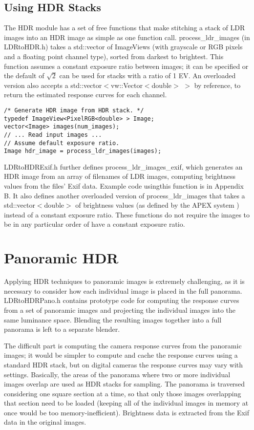 \subsection{Using HDR Stacks}
The HDR module has a set of free functions that make stitching a stack of LDR
images into an HDR image as simple as one function call. process\_ldr\_images (in 
LDRtoHDR.h) takes a std::vector of ImageViews (with grayscale or RGB pixels
and a floating point channel type), sorted from darkest to brightest. This
function assumes a constant exposure ratio between images; it can be specified
or the default of $\sqrt{2}$ can be used for stacks with a ratio of 1 EV. An
overloaded version also accepts a std::vector$<$vw::Vector$<$double$>$ $>$ by reference,
to return the estimated response curves for each channel.

\begin{verbatim}
/* Generate HDR image from HDR stack. */
typedef ImageView<PixelRGB<double> > Image;
vector<Image> images(num_images);
// ... Read input images ...
// Assume default exposure ratio.
Image hdr_image = process_ldr_images(images);
\end{verbatim}

LDRtoHDRExif.h further defines process\_ldr\_images\_exif, which generates an HDR
image from an array of filenames of LDR images, computing brightness values
from the files' Exif data. Example code usingthis function is in Appendix B. It
also defines another overloaded version of process\_ldr\_images that takes a
std::vector$<$double$>$ of brightness values (as defined by the APEX system \cite{apex})
instead of a constant exposure ratio. These functions do not require the images
to be in any particular order of have a constant exposure ratio.

\section{Panoramic HDR}
Applying HDR techniques to panoramic images is extremely challenging,
as it is necessary to consider how each individual image is placed in
the full panorama.  LDRtoHDRPano.h contains prototype code for
computing the response curves from a set of panoramic images and
projecting the individual images into the same luminance
space. Blending the resulting images together into a full panorama is
left to a separate blender.

The difficult part is computing the camera response curves from the
panoramic images; it would be simpler to compute and cache the
response curves using a standard HDR stack, but on digital cameras the
response curves may vary with settings. Basically, the areas of the
panorama where two or more individual images overlap are used as HDR
stacks for sampling. The panorama is traversed considering one square
section at a time, so that only those images overlapping that section
need to be loaded (keeping all of the individual images in memory at
once would be too memory-inefficient).  Brightness data is extracted
from the Exif data in the original images.

